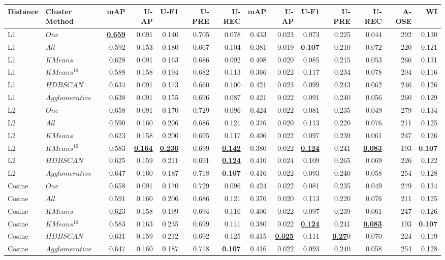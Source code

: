 \begin{tabular}{llrrrrrrrrrrrr}
\toprule
Distance & Cluster Method & mAP & U-AP & U-F1 & U-PRE & U-REC & mAP & U-AP & U-F1 & U-PRE & U-REC & A-OSE & WI \\
\midrule
L1 & $One$ & \underline{\textbf{0.659}} & 0.091 & 0.140 & 0.705 & 0.078 & 0.433 & 0.023 & 0.073 & 0.225 & 0.044 & 292 & 0.130 \\
L1 & $All$ & 0.592 & 0.153 & 0.180 & 0.667 & 0.104 & 0.381 & 0.019 & \textbf{0.107} & 0.210 & 0.072 & 220 & 0.121 \\
L1 & $KMeans$ & 0.628 & 0.091 & 0.163 & 0.686 & 0.092 & 0.408 & 0.020 & 0.085 & 0.215 & 0.053 & 266 & 0.131 \\
L1 & $KMeans^{10}$ & 0.588 & 0.158 & 0.194 & 0.682 & 0.113 & 0.366 & 0.022 & 0.117 & 0.234 & 0.078 & 204 & 0.116 \\
L1 & $HDBSCAN$ & 0.634 & 0.091 & 0.173 & 0.660 & 0.100 & 0.421 & 0.023 & 0.099 & 0.243 & 0.062 & 246 & 0.126 \\
L1 & $Agglomerative$ & 0.638 & 0.091 & 0.155 & 0.696 & 0.087 & 0.421 & 0.022 & 0.091 & 0.240 & 0.056 & 260 & 0.129 \\
\midrule
L2 & $One$ & 0.658 & 0.091 & 0.170 & 0.729 & 0.096 & 0.424 & 0.022 & 0.081 & 0.235 & 0.049 & 279 & 0.134 \\
L2 & $All$ & 0.590 & 0.160 & 0.206 & 0.686 & 0.121 & 0.376 & 0.020 & 0.113 & 0.220 & 0.076 & 211 & 0.125 \\
L2 & $KMeans$ & 0.623 & 0.158 & 0.200 & 0.695 & 0.117 & 0.406 & 0.022 & 0.097 & 0.239 & 0.061 & 247 & 0.126 \\
L2 & $KMeans^{10}$ & 0.583 & \underline{\textbf{0.164}} & \underline{\textbf{0.236}} & 0.699 & \underline{\textbf{0.142}} & 0.380 & 0.022 & \underline{\textbf{0.124}} & 0.241 & \underline{\textbf{0.083}} & 193 & \textbf{0.107} \\
L2 & $HDBSCAN$ & 0.625 & 0.159 & 0.211 & 0.691 & \underline{\textbf{0.124}} & 0.410 & 0.024 & 0.109 & 0.265 & 0.069 & 226 & 0.122 \\
L2 & $Agglomerative$ & 0.647 & 0.160 & 0.187 & 0.718 & \textbf{0.107} & 0.416 & 0.022 & 0.093 & 0.240 & 0.058 & 254 & 0.128 \\
\midrule
Cosine & $One$ & 0.658 & 0.091 & 0.170 & 0.729 & 0.096 & 0.424 & 0.022 & 0.081 & 0.235 & 0.049 & 279 & 0.134 \\
Cosine & $All$ & 0.591 & 0.160 & 0.206 & 0.686 & 0.121 & 0.376 & 0.020 & 0.113 & 0.220 & 0.076 & 211 & 0.125 \\
Cosine & $KMeans$ & 0.623 & 0.158 & 0.199 & 0.694 & 0.116 & 0.406 & 0.022 & 0.097 & 0.239 & 0.061 & 247 & 0.126 \\
Cosine & $KMeans^{10}$ & 0.583 & 0.163 & 0.235 & 0.699 & 0.141 & 0.380 & 0.022 & \underline{\textbf{0.124}} & 0.241 & \underline{\textbf{0.083}} & 193 & \textbf{0.107} \\
Cosine & $HDBSCAN$ & 0.631 & 0.159 & 0.212 & 0.692 & 0.125 & 0.415 & \underline{\textbf{0.025}} & 0.111 & \underline{\textbf{0.27}}0 & 0.070 & 224 & 0.119 \\
Cosine & $Agglomerative$ & 0.647 & 0.160 & 0.187 & 0.718 & \textbf{0.107} & 0.416 & 0.022 & 0.093 & 0.240 & 0.058 & 254 & 0.128 \\
\midrule
\bottomrule
\end{tabular}